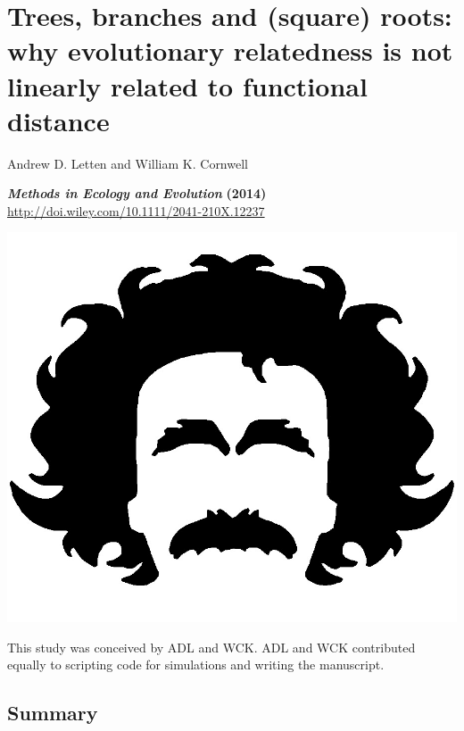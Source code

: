 \chapter{Trees, branches and (square) roots: why evolutionary relatedness is not linearly related to functional distance}

\graphicspath{{Chapter3/Figs/}}

\begin{center}

{\large Andrew D. Letten and William K. Cornwell}

\small\textit{\textbf{Methods in Ecology and Evolution}} \textbf{(2014)}\\
\url{http://doi.wiley.com/10.1111/2041-210X.12237}

\vspace{1in}
\includegraphics[width=0.15\linewidth]{Chapter3/Figs/Einstein_whitejpg}

\vfill
This study was conceived by ADL and WCK. ADL and WCK contributed equally to scripting code for simulations and writing the manuscript. 

\end{center}

\newpage
\section{Summary}

